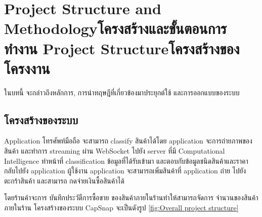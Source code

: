 \chapter{\ifproject%
\ifenglish Project Structure and Methodology\else โครงสร้างและขั้นตอนการทำงาน\fi
\else%
\ifenglish Project Structure\else โครงสร้างของโครงงาน\fi
\fi
}

ในบทนี้ จะกล่าวถึงหลักการ,  การนําทฤษฎีที่เกี่ยวข้องมาประยุกต์ใช้  และการออกแบบของระบบ


\makeatletter


\makeatother
\section{โครงสร้างของระบบ}

Application โทรศัพท์มือถือ จะสามารถ classify สินค้าได้โดย application จะการถ่ายภาพของสินค้า และทำการ streaming ผ่าน WebSocket 
ไปยัง server ที่มี Computational Intelligence ทำหน้าที่ classification ข้อมูลที่ได้รับเข้ามา  และตอบกับข้อมูลชนิดสินค้าและราคา กลับไปยัง application
ผู้ใช้งาน application จะสามารถเพิ่มสินค้าที่ application ถ่าย ไปยังตะกร้าสินค้า และสามารถ กดจ่ายเงินซื้อสินค้าได้

 โดยร้านค้าจะการ บันทึกประวัตืการซื้อขาย ของสินค้าภายในร้านทำให้สามารถจัดการ จำนวนของสินค้าภายในร้าน โครงสร้างของระบบ CapSnap จะเป็นดังรูป \ref{fig:Overall project structure}



